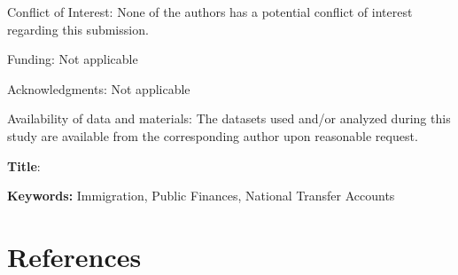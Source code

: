 \documentclass[12pt,a4paper]{article}
\begin{document}
\begin{titlepage}
  \vspace{0.7em}\par
  \noindent
  Conflict of Interest: None of the authors has a potential conflict of interest regarding this submission.

  \vspace{0.7em}\par
  \noindent
  Funding: Not applicable

  \vspace{0.7em}\par
  \noindent
  Acknowledgments: Not applicable

  \vspace{0.7em}\par
  \noindent
  Availability of data and materials: The datasets used and/or analyzed during this study are available from the corresponding author upon reasonable request.


\end{titlepage}



\newpage
\setcounter{page}{1}
\captionsetup[table]{skip=0pt}
\textbf{Title}: \articleTwoTitle

\vspace{0.7em}\par
\textbf{Keywords:} Immigration, Public Finances, National Transfer Accounts


\onehalfspacing

\newpage
\begin{abstract}
  
\end{abstract}

\newpage



\section*{References}
\printbibliography[heading=none]
\end{document}
